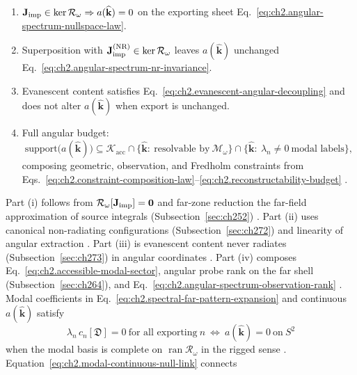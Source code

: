 \begin{enumerate}
\item[(i)] \(\mathbf{J}_{\mathrm{imp}}\in\ker\mathcal{R}_\omega\Rightarrow a(\widehat{\mathbf{k}})=0\) on the
exporting sheet Eq.~\eqref{eq:ch2.angular-spectrum-nullspace-law}.
\item[(ii)] Superposition with \(\mathbf{J}_{\mathrm{imp}}^{\mathrm{(NR)}}\in\ker\mathcal{R}_\omega\) leaves
\(a(\widehat{\mathbf{k}})\) unchanged Eq.~\eqref{eq:ch2.angular-spectrum-nr-invariance}.
\item[(iii)] Evanescent content satisfies Eq.~\eqref{eq:ch2.evanescent-angular-decoupling} and
does not alter \(a(\widehat{\mathbf{k}})\) when export is unchanged.
\item[(iv)] Full angular budget:
\begin{equation}
\label{eq:ch2.angular-spectrum-composition-law}
\text{support}\big(a(\widehat{\mathbf{k}})\big)
\subseteq
\mathcal{K}_{\mathrm{acc}}
\cap
\{\widehat{\mathbf{k}}:\ \text{resolvable by}\ \mathcal{M}_\omega\}
\cap
\{\widehat{\mathbf{k}}:\ \lambda_n\neq 0\ \text{modal labels}\},
\end{equation} composing geometric, observation, and Fredholm constraints from
Eqs.~\eqref{eq:ch2.constraint-composition-law}--\eqref{eq:ch2.reconstructability-budget}
\cite{stratton1941}.
\end{enumerate}
Part (i) follows from \(\mathcal{R}_\omega[\mathbf{J}_{\mathrm{imp}}]=\mathbf{0}\) and far-zone reduction
the far-field approximation of source integrals (Subsection~\ref{sec:ch252}) \cite{stratton1941}. Part (ii) uses
canonical non-radiating configurations (Subsection~\ref{sec:ch272}) and linearity of angular extraction
\cite{harrington2001}. Part (iii) is evanescent content never radiates (Subsection~\ref{sec:ch273}) in
angular coordinates \cite{stratton1941}. Part (iv) composes
Eq.~\eqref{eq:ch2.accessible-modal-sector}, angular probe rank on the far shell (Subsection~\ref{sec:ch264}), and
Eq.~\eqref{eq:ch2.angular-spectrum-observation-rank} \cite{stratton1941}. \label{prop:ch2.continuous-discrete-null-correspondence}
Modal coefficients in Eq.~\eqref{eq:ch2.spectral-far-pattern-expansion} and continuous
\(a(\widehat{\mathbf{k}})\) satisfy
\begin{equation}
\label{eq:ch2.modal-continuous-null-link}
\lambda_n\,c_n[\mathfrak{D}]=0\ \text{for all exporting}\ n
\ \Longleftrightarrow\
a(\widehat{\mathbf{k}})=0\ \text{on}\ S^{2}
\end{equation}
when the modal basis is complete on \(\operatorname{ran}\mathcal{R}_\omega\) in the rigged sense
\cite{stratton1941}. Equation~\eqref{eq:ch2.modal-continuous-null-link} connects
